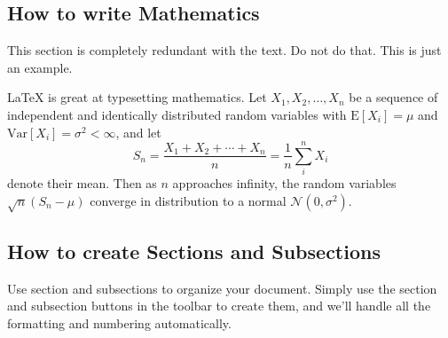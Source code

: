 \documentclass[12pt]{article}
\begin{document}
\subsection*{How to write Mathematics}

This section is completely redundant with the text. Do not do
that. This is just an example.

\LaTeX{} is great at typesetting mathematics. Let $X_1, X_2, \ldots, X_n$ be a sequence of independent and identically distributed random variables with $\text{E}[X_i] = \mu$ and $\text{Var}[X_i] = \sigma^2 < \infty$, and let
\[S_n = \frac{X_1 + X_2 + \cdots + X_n}{n}
      = \frac{1}{n}\sum_{i}^{n} X_i\]
denote their mean. Then as $n$ approaches infinity, the random variables $\sqrt{n}(S_n - \mu)$ converge in distribution to a normal $\mathcal{N}(0, \sigma^2)$.


\subsection*{How to create Sections and Subsections}

Use section and subsections to organize your document. Simply use the section and subsection buttons in the toolbar to create them, and we'll handle all the formatting and numbering automatically.
\end{document}
